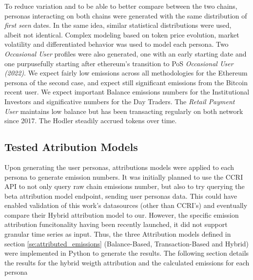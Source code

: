 \documentclass[11pt]{report}
\begin{document}




To reduce variation and to be able to better compare between the two chains, personas interacting on both chains were generated with the same distribution of \textit{first seen} dates. In the same idea, similar statistical distributions were used, albeit not identical. Complex modeling based on token price evolution, market volatility and differentiated behavior was used to model each persona. Two \textit{Occasional User} profiles were also generated, one with an early starting date and one purpusefully starting after ethereum's transition to PoS \textit{Occasional User (2022)}. We expect fairly low emissions across all methodologies for the Ethereum persona of the second case, and expect still significant emissions from the Bitcoin recent user. We expect important Balance emissions numbers for the Institutional Investors and significative numbers for the Day Traders. The \textit{Retail Payment User} maintains low balance but has been transacting regularly on both network since 2017. The Hodler steadily accrued tokens over time.

\subsection{Tested Atribution Models}

Upon generating the user personas, attributions models were applied to each persona to generate emission numbers. It was initially planned to use the \ac{CCRI} API to not only query raw chain emissions number, but also to try querying the beta attribution model endpoint, sending user personas data. This could have enabled validation of this work's datasources (other than CCRI's) and eventually compare their Hybrid attribution model to our. However, the specific emission attribution funcitonality having been recently launched, it did not support granular time series as input. Thus, the three Attribution models defined in section \ref{se:attributed_emissions} (Balance-Based, Transaction-Based and Hybrid) were implemented in Python to generate the results. The following section details the results for the hybrid weigth attribution and the calculated emissions for each persona


\end{document}
